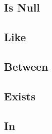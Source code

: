 
\subsection{Is Null}

\subsection{Like}

\subsection{Between}

\subsection{Exists}

\subsection{In}